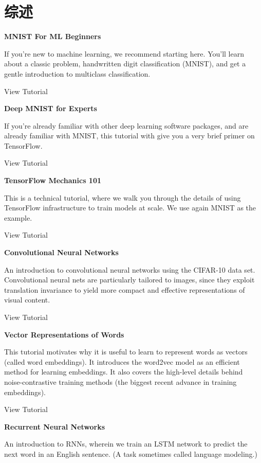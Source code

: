 


\section{综述}

\textbf{MNIST For ML Beginners}

If you're new to machine learning, we recommend starting here. You'll learn about a classic problem, handwritten digit classification (MNIST), and get a gentle introduction to multiclass classification.

View Tutorial

\textbf{Deep MNIST for Experts}

If you're already familiar with other deep learning software packages, and are already familiar with MNIST, this tutorial with give you a very brief primer on TensorFlow.

View Tutorial

\textbf{TensorFlow Mechanics 101}

This is a technical tutorial, where we walk you through the details of using TensorFlow infrastructure to train models at scale. We use again MNIST as the example.

View Tutorial

\textbf{Convolutional Neural Networks}

An introduction to convolutional neural networks using the CIFAR-10 data set. Convolutional neural nets are particularly tailored to images, since they exploit translation invariance to yield more compact and effective representations of visual content.

View Tutorial

\textbf{Vector Representations of Words}

This tutorial motivates why it is useful to learn to represent words as vectors (called word embeddings). It introduces the word2vec model as an efficient method for learning embeddings. It also covers the high-level details behind noise-contrastive training methods (the biggest recent advance in training embeddings).

View Tutorial

\textbf{Recurrent Neural Networks}

An introduction to RNNs, wherein we train an LSTM network to predict the next word in an English sentence. (A task sometimes called language modeling.)

